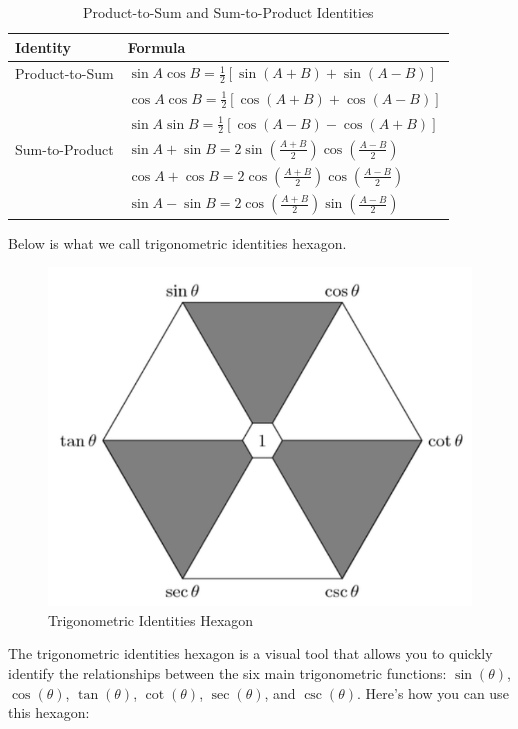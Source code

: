 \begin{table}[h]
\centering
\begin{tabular}{@{}ll@{}}
\toprule
Identity & Formula \\
\midrule
Product-to-Sum & $\sin A \cos B = \frac{1}{2}[\sin(A + B) + \sin(A - B)]$ \\
 & $\cos A \cos B = \frac{1}{2}[\cos(A + B) + \cos(A - B)]$ \\
 & $\sin A \sin B = \frac{1}{2}[\cos(A - B) - \cos(A + B)]$ \\
\midrule
Sum-to-Product & $\sin A + \sin B = 2 \sin(\frac{A + B}{2}) \cos(\frac{A - B}{2})$ \\
 & $\cos A + \cos B = 2 \cos(\frac{A + B}{2}) \cos(\frac{A - B}{2})$ \\
 & $\sin A - \sin B = 2 \cos(\frac{A + B}{2}) \sin(\frac{A - B}{2})$ \\
\bottomrule
\end{tabular}
\caption{Product-to-Sum and Sum-to-Product Identities}
\label{tab:product_sum_identities}
\end{table}

Below is what we call trigonometric identities hexagon.
\begin{figure}[h]
    \centering
    \includegraphics[width=0.5\linewidth]{Images/trighex.png}
    \caption{Trigonometric Identities Hexagon}
    \label{fig:enter-label}
\end{figure}


   

The trigonometric identities hexagon is a visual tool that allows you to quickly identify the relationships between the six main trigonometric functions: \(\sin(\theta)\), \(\cos(\theta)\), \(\tan(\theta)\), \(\cot(\theta)\), \(\sec(\theta)\), and \(\csc(\theta)\). Here’s how you can use this hexagon:

